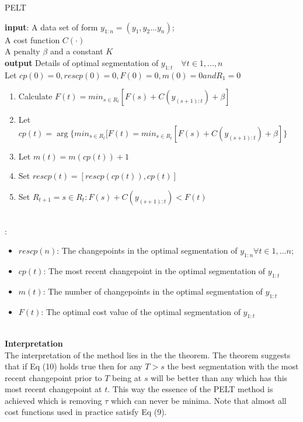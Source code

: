 \documentclass{article}
\newcommand\tab[1][0.4cm]{\hspace*{#1}}
\begin{document}
\begin{algorithm}
\caption{PELT}\label{alg:cap}

\textbf{input}: A data set of form $y_{1:n} = (y_{1},y_{2}...y_{n})$;\\
\qquad  \quad A cost function $C(\cdot)$\\
\qquad \quad A penalty $\beta$ and a constant $K$ \\
\textbf{output} Details of optimal segmentation of $y_{1:t} \quad \forall
t \in {1,...,n}$ \\
\tab Let $cp(0) = 0,rescp(0) = 0, F(0) = 0, m(0) = 0 and R_{1} = {0}$
\begin{algorithmic}
    \begin{enumerate}
        \item Calculate $F(t) = min_{s\in R_{t}} [F(s) + C(y_{(s+1) : t}) + \beta]$
        \item Let $cp(t) = \arg\{min_{s\in R_{t}}{[F(t) = min_{s\in R_{t}} [F(s) + C(y_{(s+1) : t}) + \beta]}\}$
        \item Let $ m(t) = m(cp(t)) + 1$
        \item Set $rescp(t) = [rescp(cp(t)),cp(t)]$
        \item Set $R_{t+1} = {s \in R_{t} : F(s) + C(y_{(s+1) : t}) < F(t)}$
    \end{enumerate}
\EndFor\\
\Return : 
    \begin{itemize}
        \item $rescp(n)$: The changepoints in the optimal segmentation of $y_{1:n} \forall t \in {1,...n}$; 
        \item $cp(t)$: The most recent changepoint in the optimal segmentation of $y_{1:t}$
        \item $m(t)$: The number of changepoints in the optimal segmentation of $y_{1:t}$
        \item $F(t)$: The optimal cost value of the optimal segmentation of $y_{1:t}$
    \end{itemize}
\end{algorithmic}
\end{algorithm}
\\
\textbf{Interpretation}\\
The interpretation of the method lies in the the theorem. The theorem suggests that if Eq (10) holds true then for any $T > s$ the best segmentation with the most recent changepoint prior to $T$ being at $s$ will be better than any which has this most recent changepoint at $t$. This way the essence of the PELT method is achieved which is removing $\tau$ which can never be minima. Note that almost all cost functions used in practice satisfy Eq (9). \\
\end{document}
